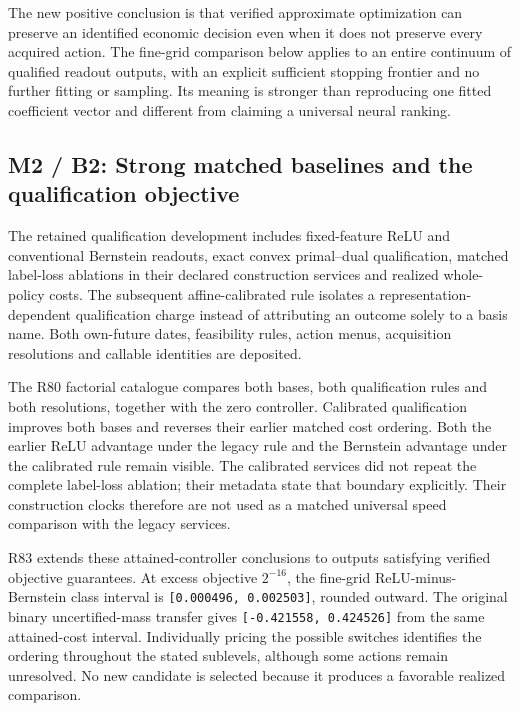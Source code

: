 \documentclass[ecta,nameyear,draft]{econsocart}
\begin{document}
The new positive conclusion is that verified approximate optimization
can preserve an identified economic decision even when it does not
preserve every acquired action. The fine-grid comparison below applies
to an entire continuum of qualified readout outputs, with an explicit
sufficient stopping frontier and no further fitting or sampling. Its
meaning is stronger than reproducing one fitted coefficient vector and
different from claiming a universal neural ranking.

\hypertarget{m2-b2-strong-matched-baselines-and-the-qualification-objective}{%
\subsection{M2 / B2: Strong matched baselines and the qualification
objective}\label{m2-b2-strong-matched-baselines-and-the-qualification-objective}}

The retained qualification development includes fixed-feature ReLU and
conventional Bernstein readouts, exact convex primal--dual
qualification, matched label-loss ablations in their declared
construction services and realized whole-policy costs. The subsequent
affine-calibrated rule isolates a representation-dependent qualification
charge instead of attributing an outcome solely to a basis name. Both
own-future dates, feasibility rules, action menus, acquisition
resolutions and callable identities are deposited.

The R80 factorial catalogue compares both bases, both qualification
rules and both resolutions, together with the zero controller.
Calibrated qualification improves both bases and reverses their earlier
matched cost ordering. Both the earlier ReLU advantage under the legacy
rule and the Bernstein advantage under the calibrated rule remain
visible. The calibrated services did not repeat the complete label-loss
ablation; their metadata state that boundary explicitly. Their
construction clocks therefore are not used as a matched universal speed
comparison with the legacy services.

R83 extends these attained-controller conclusions to outputs satisfying
verified objective guarantees. At excess objective \(2^{-16}\), the
fine-grid ReLU-minus-Bernstein class interval is
\texttt{{[}0.000496,\ 0.002503{]}}, rounded outward. The original binary
uncertified-mass transfer gives \texttt{{[}-0.421558,\ 0.424526{]}} from
the same attained-cost interval. Individually pricing the possible
switches identifies the ordering throughout the stated sublevels,
although some actions remain unresolved. No new candidate is selected
because it produces a favorable realized comparison.
\end{document}
